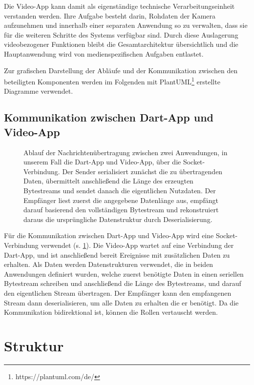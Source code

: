 Die Video-App kann damit als eigenständige technische Verarbeitungseinheit verstanden werden. Ihre Aufgabe besteht darin, Rohdaten der Kamera aufzunehmen und innerhalb einer separaten Anwendung so zu verwalten, dass sie für die weiteren Schritte des Systems verfügbar sind. 
Durch diese Auslagerung videobezogener Funktionen bleibt die Gesamtarchitektur übersichtlich und die Hauptanwendung wird von medienspezifischen Aufgaben entlastet.

Zur grafischen Darstellung der Abläufe und der Kommunikation zwischen den beteiligten Komponenten werden im Folgenden mit PlantUML\footnote{https://plantuml.com/de/} erstellte Diagramme verwendet.

\subsection{Kommunikation zwischen Dart-App und Video-App}

\begin{figure}[h!]
    \centering
    
    \caption[Nachrichtenübertragung über die Socket-Verbindung]{Ablauf der Nachrichtenübertragung zwischen zwei Anwendungen, in unserem Fall die Dart-App und Video-App, über die Socket-Verbindung. Der Sender serialisiert zunächst die zu übertragenden Daten, übermittelt anschließend die Länge des erzeugten Bytestreams und sendet danach die eigentlichen Nutzdaten. 
    Der Empfänger liest zuerst die angegebene Datenlänge aus, empfängt darauf basierend den vollständigen Bytestream und rekonstruiert daraus die ursprüngliche Datenstruktur durch Deserialisierung.}
    \label{fig:dartsocket}
\end{figure}

Für die Kommunikation zwischen Dart-App und Video-App wird eine Socket-Verbindung verwendet (s. \cref{fig:dartsocket}). Die Video-App wartet auf eine Verbindung der Dart-App, und ist anschließend bereit Ereignisse mit zusätzlichen Daten zu erhalten.
Als Daten werden Datenstrukturen verwendet, die in beiden Anwendungen definiert wurden, welche zuerst benötigte Daten in einen seriellen Bytestream schreiben und anschließend die Länge des Bytestreams, und darauf den eigentlichen Stream übertragen.
Der Empfänger kann den empfangenen Stream dann deserialisieren, um alle Daten zu erhalten die er benötigt. Da die Kommunikation bidirektional ist, können die Rollen vertauscht werden.

\section{Struktur} \label{sec:dart-ablauf}

